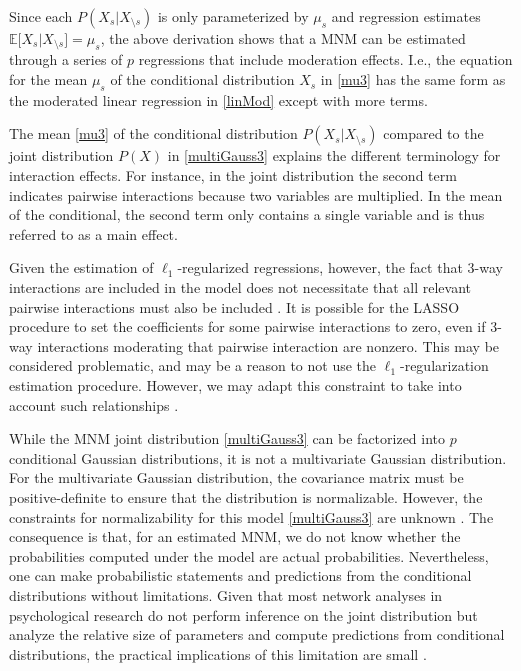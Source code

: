 Since each $P(X_s|X_{\setminus s})$ is only parameterized by $\mu_s$ and regression estimates $\mathbb{E} \lbrack X_s|X_{\setminus s} \rbrack = \mu_s$, the above derivation shows that a MNM can be estimated through a series of $p$ regressions that include moderation effects. I.e., the equation for the mean $\mu_s$ of the conditional distribution $X_s$ in \eqref{mu3} has the same form as the moderated linear regression in \eqref{linMod} except with more terms.

The mean \eqref{mu3} of the conditional distribution $P(X_s|X_{\setminus s})$ compared to the joint distribution $P(X)$ in \eqref{multiGauss3} explains the different terminology for interaction effects. For instance, in the joint distribution the second term indicates pairwise interactions because two variables are multiplied. In the mean of the conditional, the second term only contains a single variable and is thus referred to as a main effect. 

Given the estimation of $\ell_1$-regularized regressions, however, the fact that 3-way interactions are included in the model does not necessitate that all relevant pairwise interactions must also be included \cite[9--10]{haslbeck2018moderated}. It is possible for the LASSO procedure to set the coefficients for some pairwise interactions to zero, even if 3-way interactions moderating that pairwise interaction are nonzero. This may be considered problematic, and may be a reason to not use the $\ell_1$-regularization estimation procedure. However, we may adapt this constraint to take into account such relationships \cite{bien2013lasso}.

While the MNM joint distribution \eqref{multiGauss3} can be factorized into $p$ conditional Gaussian distributions, it is not a multivariate Gaussian distribution. For the multivariate Gaussian distribution, the covariance matrix must be positive-definite to ensure that the distribution is normalizable. However, the constraints for normalizability for this model \eqref{multiGauss3} are unknown \cite{yang2014mixed}. The consequence is that, for an estimated MNM, we do not know whether the probabilities computed under the model are actual probabilities. Nevertheless, one can make probabilistic statements and predictions from the conditional distributions without limitations. Given that most network analyses in psychological research do not perform inference on the joint distribution but analyze the relative size of parameters and compute predictions from conditional distributions, the practical implications of this limitation are small \cite[10]{haslbeck2018moderated}.


